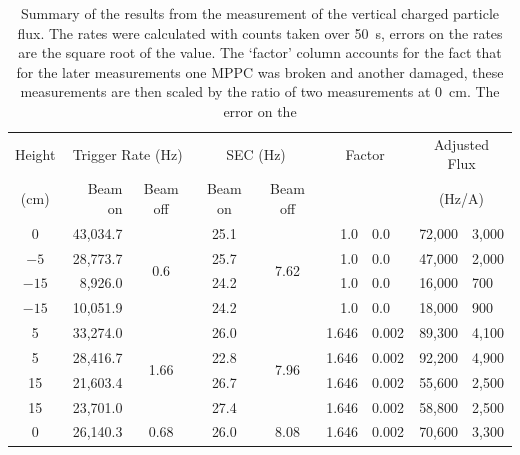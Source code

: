 \begin{table}
    \begin{center}
    \begin{tabular}{ c | r | c | c | c | r@{\( \pm \)}l | r@{\( \pm \)}l} 
        Height  &  \multicolumn{2}{c|}{Trigger Rate (Hz)}  &  \multicolumn{2}{c|}{SEC (Hz)}  &  \multicolumn{2}{c}{Factor}  &  \multicolumn{2}{c}{Adjusted Flux} \\
        (cm)   & Beam on            & Beam off        &  Beam on  &  Beam off  &  \multicolumn{2}{c|}{}  &  \multicolumn{2}{c}{(Hz/A)} \\
        \hline
        0        &  43,034.7  &  \multirow {4}{*}{0.6}  &  25.1  &  \multirow {4}{*}{7.62}  &  1.0  &  0.0  &  72,000  &  3,000\\
        \(-5\)   &  28,773.7  &                         &  25.7  &                          &  1.0  &  0.0  &  47,000  &  2,000\\
        \(-15\)  &   8,926.0  &                         &  24.2  &                          &  1.0  &  0.0  &  16,000  &    700\\
        \(-15\)  &  10,051.9  &                         &  24.2  &                          &  1.0  &  0.0  &  18,000  &    900\\
        \hline       
        5        &  33,274.0  &  \multirow {4}{*}{1.66}  &  26.0  &  \multirow {4}{*}{7.96}  &  1.646  &  0.002  &  89,300  &  4,100  \\
        5        &  28,416.7  &                          &  22.8  &                          &  1.646  &  0.002  &  92,200  &  4,900  \\
        15       &  21,603.4  &                          &  26.7  &                          &  1.646  &  0.002  &  55,600  &  2,500  \\
        15       &  23,701.0  &                          &  27.4  &                          &  1.646  &  0.002  &  58,800  &  2,500  \\
        \hline
        0        &  26,140.3  &  0.68                    &  26.0  &  8.08                    &  1.646  &  0.002  &  70,600  &  3,300  \\
    \end{tabular}
    \end{center}
    \caption{Summary of the results from the measurement of the vertical charged particle flux. The rates were calculated with counts taken over 50~s, errors on the rates are the square root of the value. The `factor' column accounts for the fact that for the later measurements one MPPC was broken and another damaged, these measurements are then scaled by the ratio of two measurements at 0~cm. The error on the }
    \label{label}
\end{table}

